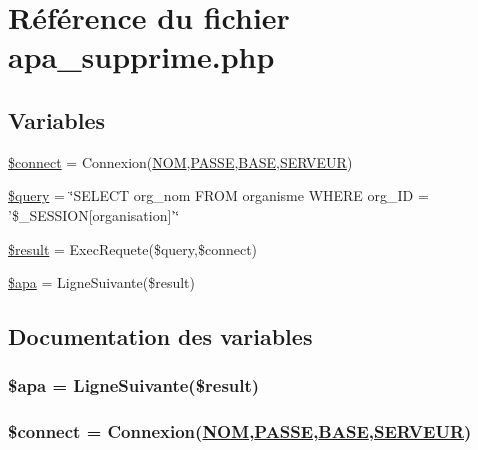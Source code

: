 \hypertarget{apa__supprime_8php}{
\section{R\'{e}f\'{e}rence du fichier apa\_\-supprime.php}
\label{apa__supprime_8php}
}
\subsection*{Variables}
\begin{CompactItemize}
\item 
\hyperlink{apa__supprime_8php_a0}{\$connect} = Connexion(\hyperlink{pma__connect_8php_a0}{NOM},\hyperlink{pma__connect_8php_a1}{PASSE},\hyperlink{pma__connect_8php_a3}{BASE},\hyperlink{pma__connect_8php_a2}{SERVEUR})
\item 
\hyperlink{apa__supprime_8php_a1}{\$query} = \char`\"{}SELECT org\_\-nom FROM organisme WHERE org\_\-ID = '\$\_\-SESSION\mbox{[}organisation\mbox{]}'\char`\"{}
\item 
\hyperlink{apa__supprime_8php_a2}{\$result} = Exec\-Requete(\$query,\$connect)
\item 
\hyperlink{apa__supprime_8php_a3}{\$apa} = Ligne\-Suivante(\$result)
\end{CompactItemize}


\subsection{Documentation des variables}
\hypertarget{apa__supprime_8php_a3}{
\subsubsection[\$apa]{\setlength{\rightskip}{0pt plus 5cm}\$apa = Ligne\-Suivante(\$result)}}
\label{apa__supprime_8php_a3}


\hypertarget{apa__supprime_8php_a0}{
\subsubsection[\$connect]{\setlength{\rightskip}{0pt plus 5cm}\$connect = Connexion(\hyperlink{pma__connect_8php_a0}{NOM},\hyperlink{pma__connect_8php_a1}{PASSE},\hyperlink{pma__connect_8php_a3}{BASE},\hyperlink{pma__connect_8php_a2}{SERVEUR})}}
\label{apa__supprime_8php_a0}


